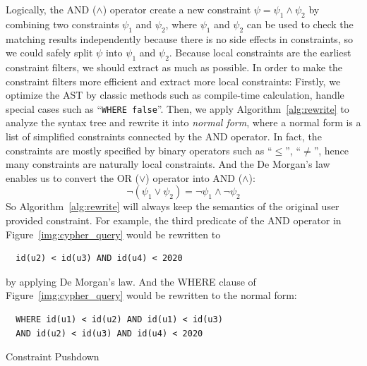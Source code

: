 Logically, the AND ($\land$) operator create a new constraint $\psi = \psi_1 \land \psi_2$ by combining two constraints $\psi_1$ and $\psi_2$,
where $\psi_1$ and $\psi_2$ can be used to check the matching results independently because there is no side effects in constraints,
so we could safely split $\psi$ into $\psi_1$ and $\psi_2$.
Because local constraints are the earliest constraint filters, we should extract as much as possible.
In order to make the constraint filters more efficient and extract more local constraints:
Firstly, we optimize the AST by classic methods such as compile-time calculation,
handle special cases such as ``\texttt{WHERE false}''.
Then, we apply Algorithm~\ref{alg:rewrite} to analyze the syntax tree and rewrite it into \emph{normal form},
where a normal form is a list of simplified constraints connected by the AND operator.
In fact, the constraints are mostly specified by binary operators such as ``$\le$'', ``$\ne$'',
hence many constraints are naturally local constraints.
And the De Morgan's law enables us to convert the OR ($\lor$) operator into AND ($\land$):
\begin{equation}
  \lnot (\psi_1 \lor \psi_2) = \lnot \psi_1 \land \lnot \psi_2
\end{equation}
So Algorithm~\ref{alg:rewrite} will always keep the semantics of the original user provided constraint.
For example, the third predicate of the AND operator in Figure~\ref{img:cypher_query} would be rewritten to
\begin{verbatim}
  id(u2) < id(u3) AND id(u4) < 2020
\end{verbatim}
by applying De Morgan's law.
And the WHERE clause of Figure~\ref{img:cypher_query} would be rewritten to the normal form:
\begin{verbatim}
  WHERE id(u1) < id(u2) AND id(u1) < id(u3)
  AND id(u2) < id(u3) AND id(u4) < 2020
\end{verbatim}

\begin{algorithm}[ht]
  \caption{Constraint Pushdown}\label{alg:push_down}
\end{algorithm}

